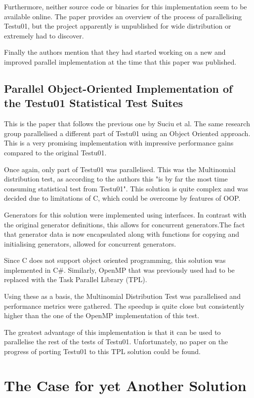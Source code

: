 Furthermore, neither source code or binaries for this implementation seem to be available online. The paper provides an overview of the process of parallelising Testu01, but the project apparently is unpublished for wide distribution or extremely had to discover.

Finally the authors mention that they had started working on a new and improved parallel implementation at the time that this paper was published.

\subsection{Parallel Object-Oriented Implementation of the Testu01 Statistical Test Suites}
This is the paper that follows the previous one by Suciu et al. The same research group parallelised a different part of Testu01 using an Object Oriented approach. This is a very promising implementation with impressive performance gains compared to the original Testu01.

Once again, only part of Testu01 was parallelised. This was the Multinomial distribution test, as according to the authors this "is by far the most time consuming statistical test from Testu01". This solution is quite complex and was decided due to limitations of C, which could be overcome by features of OOP.

Generators for this solution were implemented using interfaces. In contrast with the original generator definitions, this allows for concurrent generators.The fact that generator data is now encapsulated along with functions for copying and initialising generators, allowed for concurrent generators.

Since C does not support object oriented programming, this solution was implemented in C\#. Similarly, OpenMP that was previously used had to be replaced with the Task Parallel Library (TPL).

Using these as a basis, the Multinomial Distribution Test was parallelised and performance metrics were gathered. The speedup is quite close but consistently higher than the one of the OpenMP implementation of this test.

The greatest advantage of this implementation is that it can be used to parallelise the rest of the tests of Testu01. Unfortunately, no paper on the progress of porting Testu01 to this TPL solution could be found.

\section{The Case for yet Another Solution}
